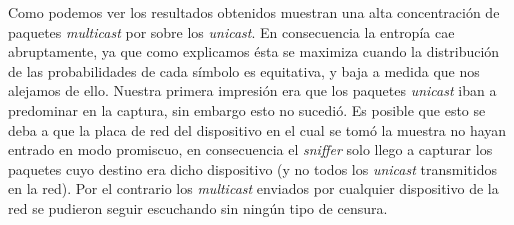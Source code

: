 \begin{figure}[hp!]
	\begin{minipage}[b]{0.9\linewidth}
	\end{minipage}
\end{figure}


Como podemos ver los resultados obtenidos muestran una alta concentración de
paquetes \textit{multicast} por sobre los \textit{unicast}. En consecuencia la
entropía cae abruptamente, ya que como explicamos ésta se maximiza cuando la
distribución de las probabilidades de cada símbolo es equitativa, y baja a
medida que nos alejamos de ello. Nuestra primera impresión era que los
paquetes \textit{unicast} iban a predominar en la captura, sin embargo esto no
sucedió. Es posible que esto se deba a que la placa de red del dispositivo en
el cual se tomó la muestra no hayan entrado en modo promiscuo, en consecuencia
el \textit{sniffer} solo llego a capturar los paquetes cuyo destino era dicho
dispositivo (y no todos los \textit{unicast} transmitidos en la red). Por el
contrario los \textit{multicast} enviados por cualquier dispositivo de la red
se pudieron seguir escuchando sin ningún tipo de censura.

